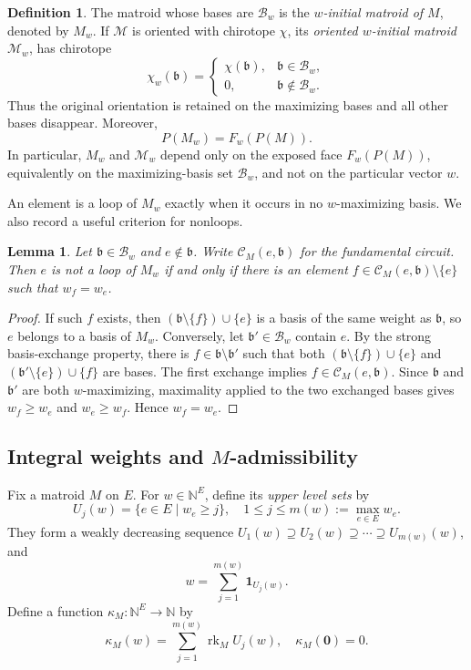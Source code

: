 \documentclass[10pt]{amsart}
\theoremstyle{plain}
\newtheorem{lemma}[theorem]{Lemma}
\theoremstyle{definition}
\newtheorem{definition}[theorem]{Definition}
\newcommand{\zero}{\mathbf{0}}
\newcommand{\one}{\mathbf{1}}
\newcommand{\NN}{\mathbb{N}}
\newcommand{\B}{\mathcal{B}}
\newcommand{\C}{\mathcal{C}}
\newcommand{\M}{\mathcal{M}}
\newcommand{\rk}{\operatorname{rk}}
\newcommand{\bb}{\mathfrak{b}}
\begin{document}
\begin{definition}\label{weight-initial-matroid}
The matroid whose bases are $\B_w$ is the \emph{$w$-initial matroid of $M$}, denoted by $M_w$. If $\M$ is oriented with chirotope $\chi$, its \emph{oriented $w$-initial matroid} $\M_w$, has chirotope
\[
\chi_w(\bb)=\begin{cases}
  \chi(\bb),&\bb\in\B_w,\\
  0,&\bb\not\in\B_w.
\end{cases}
\]
Thus the original orientation is retained on the maximizing bases and all other bases disappear. Moreover,
\[
P(M_w)=F_w(P(M)).
\]
In particular, $M_w$ and $\M_w$ depend only on the exposed face $F_w(P(M))$, equivalently on the maximizing-basis set $\B_w$, and not on the particular vector $w$.
\end{definition}

An element is a loop of $M_w$ exactly when it occurs in no $w$-maximizing basis. We also record a useful criterion for nonloops.

\begin{lemma}\label{nonloop}
Let $\bb\in\B_w$ and $e\not\in\bb$. Write $\C_M(e,\bb)$ for the fundamental circuit. Then $e$ is not a loop of $M_w$ if and only if there is an element $f\in \C_M(e,\bb)\setminus\{e\}$ such that $w_f=w_e$.
\end{lemma}

\begin{proof}
If such $f$ exists, then $(\bb\setminus\{f\})\cup\{e\}$ is a basis of the same weight as $\bb$, so $e$ belongs to a basis of $M_w$. Conversely, let $\bb'\in\B_w$ contain $e$. By the strong basis-exchange property, there is $f\in\bb\setminus\bb'$ such that both $(\bb\setminus\{f\})\cup\{e\}$ and $(\bb'\setminus\{e\})\cup\{f\}$ are bases. The first exchange implies $f\in \C_M(e,\bb)$. Since $\bb$ and $\bb'$ are both $w$-maximizing, maximality applied to the two exchanged bases gives $w_f\geq w_e$ and $w_e\geq w_f$. Hence $w_f=w_e$.
\end{proof}

\subsection{Integral weights and $M$-admissibility}

Fix a matroid $M$ on $E$. For $w\in\NN^E$, define its \emph{upper level sets} by
\begin{equation}\label{upper-level-set}
U_j(w)=\{e\in E \mid w_e\geq j\}, \quad 1\leq j\leq m(w):=\max_{e\in E}w_e.
\end{equation}
They form a weakly decreasing sequence $U_1(w)\supseteq U_2(w)\supseteq\cdots \supseteq U_{m(w)}(w)$, and
\begin{equation}\label{layercake}
 w=\sum_{j=1}^{m(w)}\one_{U_j(w)}.
\end{equation}
Define a function $\kappa_M:\NN^E\to \NN$ by
\begin{equation}\label{kappa-def}
\kappa_M(w)=\sum_{j=1}^{m(w)}\rk_M U_j(w),\quad \kappa_M(\zero)=0.
\end{equation}
\end{document}
